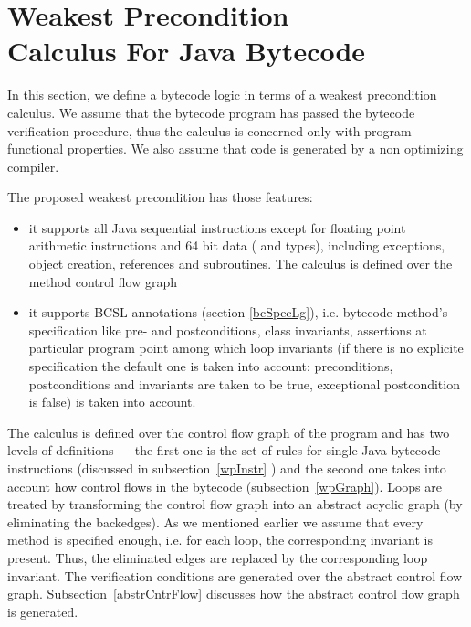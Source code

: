 
\section{Weakest Precondition \\Calculus For Java Bytecode}\label{wpbc}
In this section, we define a bytecode logic in terms of a weakest precondition calculus.
We assume that the bytecode program has passed the bytecode verification procedure,
 thus the calculus is concerned only with program functional properties. We also assume that code is generated by a non optimizing compiler. 

The proposed weakest precondition has those features:
\begin{itemize}
\item it supports all Java sequential instructions except for floating point arithmetic instructions and 64 bit data ( and  types), including 
exceptions, object creation, references and subroutines. The calculus is defined over the method control flow graph

\item it supports BCSL annotations (section \ref{bcSpecLg}), i.e. bytecode method's specification like pre- and postconditions, class invariants, assertions at particular program point among 
which loop invariants (if there is no explicite specification  the default one is taken into account: preconditions, postconditions and invariants are taken to be true, exceptional postcondition is false) is taken into account. %
\end{itemize}

The calculus is defined over the control flow graph of the program and has two levels of definitions --- the first one is the set of rules for single Java bytecode instructions (discussed in subsection~\ref{wpInstr} ) and the second one takes into account how control
 flows in the bytecode (subsection~\ref{wpGraph}).
Loops are treated by transforming the control flow graph into an abstract acyclic graph (by eliminating the backedges). As we mentioned earlier we assume that every method is specified enough, i.e. for each loop, the corresponding invariant is present. Thus, the eliminated edges are replaced by the corresponding loop invariant. 
 The verification conditions are generated over the abstract control flow graph. Subsection~\ref{abstrCntrFlow} discusses 
how the abstract control flow graph is generated.

